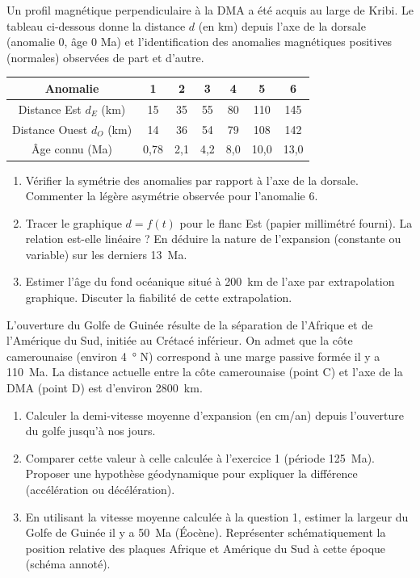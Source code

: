 \documentclass[11pt]{article}
\begin{document}
\begin{exercice}
\label{exo:anomalies}
Un profil magnétique perpendiculaire à la DMA a été acquis au large de Kribi. Le tableau ci-dessous donne la distance $d$ (en km) depuis l'axe de la dorsale (anomalie 0, âge 0 Ma) et l'identification des anomalies magnétiques positives (normales) observées de part et d'autre.
\begin{center}
\begin{tabular}{|c|c|c|c|c|c|c|}
\hline
Anomalie & 1 & 2 & 3 & 4 & 5 & 6 \\
\hline
Distance Est $d_E$ (km) & 15 & 35 & 55 & 80 & 110 & 145 \\
\hline
Distance Ouest $d_O$ (km) & 14 & 36 & 54 & 79 & 108 & 142 \\
\hline
Âge connu (Ma) & 0,78 & 2,1 & 4,2 & 8,0 & 10,0 & 13,0 \\
\hline
\end{tabular}
\end{center}
\begin{enumerate}
    \item[2 pts] Vérifier la symétrie des anomalies par rapport à l'axe de la dorsale. Commenter la légère asymétrie observée pour l'anomalie 6.
    \item[3 pts] Tracer le graphique $d = f(t)$ pour le flanc Est (papier millimétré fourni). La relation est-elle linéaire ? En déduire la nature de l'expansion (constante ou variable) sur les derniers \SI{13}{Ma}.
    \item[2 pts] Estimer l'âge du fond océanique situé à \SI{200}{km} de l'axe par extrapolation graphique. Discuter la fiabilité de cette extrapolation.
\end{enumerate}
\end{exercice}

\begin{exercice}
\label{exo:golfe}
L'ouverture du Golfe de Guinée résulte de la séparation de l'Afrique et de l'Amérique du Sud, initiée au Crétacé inférieur. On admet que la côte camerounaise (environ \SI{4}{°} N) correspond à une marge passive formée il y a \SI{110}{Ma}. La distance actuelle entre la côte camerounaise (point C) et l'axe de la DMA (point D) est d'environ \SI{2800}{km}.
\begin{enumerate}
    \item[2 pts] Calculer la demi-vitesse moyenne d'expansion (en cm/an) depuis l'ouverture du golfe jusqu'à nos jours.
    \item[2 pts] Comparer cette valeur à celle calculée à l'exercice 1 (période \SI{125}{Ma}). Proposer une hypothèse géodynamique pour expliquer la différence (accélération ou décélération).
    \item[3 pts] En utilisant la vitesse moyenne calculée à la question 1, estimer la largeur du Golfe de Guinée il y a \SI{50}{Ma} (Éocène). Représenter schématiquement la position relative des plaques Afrique et Amérique du Sud à cette époque (schéma annoté).
\end{enumerate}
\end{exercice}
\end{document}

